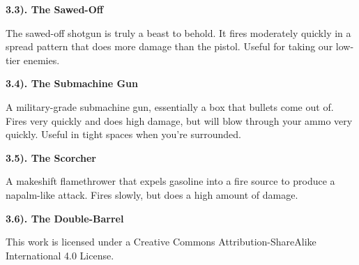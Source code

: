 \documentclass[12pt]{article}
\begin{document}
\begin{flushleft}
\textbf{3.3). The Sawed-Off}

The sawed-off shotgun is truly a beast to behold. It fires moderately quickly in a spread pattern that does more damage than the pistol. Useful for taking our low-tier enemies.

\textbf{3.4). The Submachine Gun}

A military-grade submachine gun, essentially a box that bullets come out of. Fires very quickly and does high damage, but will blow through your ammo very quickly. Useful in tight spaces when you're surrounded.

\textbf{3.5). The Scorcher}

A makeshift flamethrower that expels gasoline into a fire source to produce a napalm-like attack. Fires slowly, but does a high amount of damage.

\textbf{3.6). The Double-Barrel}

This work is licensed under a Creative Commons Attribution-ShareAlike International 4.0 License.
\end{flushleft}
\end{document}
